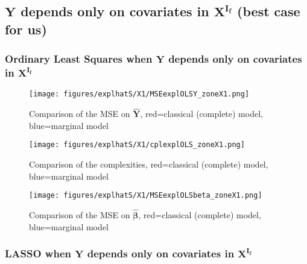 \documentclass[12pt,a4paper]{report}
\begin{document}





\clearpage
\newpage
\subsection{$\boldsymbol{Y}$ depends only on covariates in $\boldsymbol{X^{I_f}}$ (best case for us)}	 \label{tableMSEsimdroite}
\FloatBarrier



\subsubsection{Ordinary Least Squares when $\boldsymbol{Y}$ depends only on covariates in $\boldsymbol{X^{I_f}}$}

	\begin{figure}[h!]
	\centering
		  \texttt{[image: figures/explhatS/X1/MSEexplOLSY\_zoneX1.png]}
		\caption{Comparison of the MSE on $\hat{\boldsymbol{Y}}$, red=classical (complete) model, blue=marginal model}\label{MSEexplOLSY_zoneX1}
	\end{figure}
	\begin{figure}[h!]
	\centering
		  \texttt{[image: figures/explhatS/X1/cplexplOLS\_zoneX1.png]}
		\caption{Comparison of the complexities, red=classical (complete) model, blue=marginal model}\label{cplexplOLS_zoneX1}
	\end{figure}
	\begin{figure}[h!]
	\centering
		  \texttt{[image: figures/explhatS/X1/MSEexplOLSbeta\_zoneX1.png]}
		\caption{Comparison of the MSE on $\hat{\boldsymbol{\beta}}$, red=classical (complete) model, blue=marginal model}\label{MSEexplOLSbeta_zoneX1}
	\end{figure}
	\FloatBarrier
\newpage
\subsubsection{LASSO when $\boldsymbol{Y}$ depends only on covariates in $\boldsymbol{X^{I_f}}$}
\end{document}
